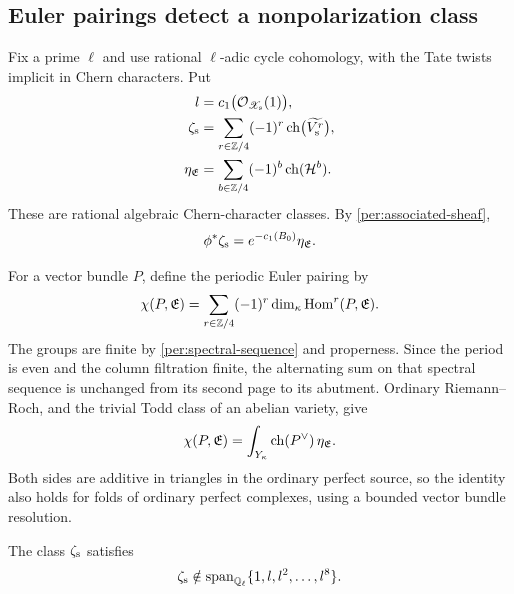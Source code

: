 \subsection{Euler pairings detect a nonpolarization class}

Fix a prime $\ell$ and use rational $\ell$-adic cycle cohomology,
with the Tate twists implicit in Chern characters.  Put
\begin{equation}
 \begin{split}
 l&=c_1\bigl(\mathcal O_{\mathscr X_{\rm s}}(1)\bigr),\\
 \zeta_{\rm s}
   &=\sum_{r\in\mathbb Z/4}(-1)^r
                  \operatorname{ch}\bigl(\widetilde{V_{\rm s}^r}\bigr),\\
 \eta_{\mathfrak E}
   &=\sum_{b\in\mathbb Z/4}(-1)^b\operatorname{ch}(\mathcal H^b).
 \end{split}
 \label{per:characters}
\end{equation}
These are rational algebraic Chern-character classes.  By
\eqref{per:associated-sheaf},
\begin{equation}
 \phi^*\zeta_{\rm s}
       =e^{-c_1(B_0)}\eta_{\mathfrak E}.
 \label{per:character-comparison}
\end{equation}

For a vector bundle $P$, define the periodic Euler pairing by
\[
 \chi(P,\mathfrak E)
    =\sum_{r\in\mathbb Z/4}(-1)^r
                       \dim_\kappa\operatorname{Hom}^r(P,\mathfrak E).
\]
The groups are finite by \eqref{per:spectral-sequence} and properness.
Since the period is even and the column filtration finite, the
alternating sum on that spectral sequence is unchanged from its
second page to its abutment.  Ordinary Riemann--Roch, and the trivial
Todd class of an abelian variety, give
\begin{equation}
 \chi(P,\mathfrak E)
    =\int_{Y_\kappa}\operatorname{ch}(P^\vee)\,\eta_{\mathfrak E}.
 \label{per:rr}
\end{equation}
Both sides are additive in triangles in the ordinary perfect source,
so the identity also holds for folds of ordinary perfect complexes,
using a bounded vector bundle resolution.

\begin{proposition}
\label{per:nonpolarization}
The class $\zeta_{\rm s}$ satisfies
\begin{equation}
 \zeta_{\rm s}\notin
       \operatorname{span}_{\mathbb Q_\ell}\{1,l,l^2,\ldots,l^8\}.
 \label{per:nonpolarization-equation}
\end{equation}
\end{proposition}

